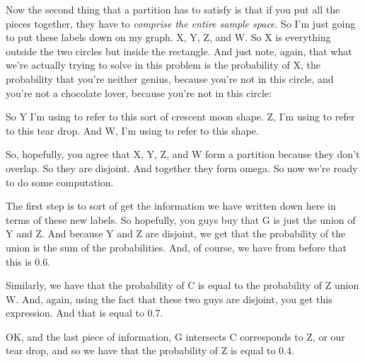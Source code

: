 \documentclass[pdftex, brazil, 12pt, twoside]{article}
\begin{document}
Now the second thing that a partition has to satisfy is
that if you put all the pieces together, they have to
\emph{comprise the entire sample space}.
So I'm just going to put these labels down on my graph.
X, Y, Z, and W. So X is everything outside the two
circles but inside the rectangle.
And just note, again, that what we're actually trying to
solve in this problem is the probability of X, the
probability that you're neither genius, because you're
not in this circle, and you're not a chocolate lover, because
you're not in this circle:

\begin{figure}[H]
  \begin{center}
  \end{center}
\end{figure}

So Y I'm using to refer to this sort of
crescent moon shape.
Z, I'm using to refer to this tear drop.
And W, I'm using to refer to this shape.

So, hopefully, you agree that X, Y, Z, and W form a
partition because they don't overlap.
So they are disjoint.
And together they form omega.
So now we're ready to do some computation.

The first step is to sort of get the information we have
written down here in terms of these new labels.
So hopefully, you guys buy that G is just the union of Y
and Z. And because Y and Z are disjoint, we get that the
probability of the union is the sum of the probabilities.
And, of course, we have from before that this is 0.6.

Similarly, we have that the probability of C is equal to
the probability of Z union W. And, again, using the fact
that these two guys are disjoint, you get this
expression.
And that is equal to 0.7.

OK, and the last piece of information, G intersects C
corresponds to Z, or our tear drop, and so we have that the
probability of Z is equal to 0.4.
\end{document}
